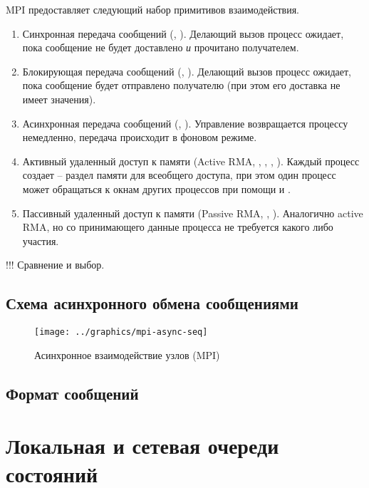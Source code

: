 MPI предоставляет следующий набор примитивов взаимодействия.

\begin{enumerate}
\item Синхронная передача сообщений (, ). Делающий вызов процесс
  ожидает, пока сообщение не будет доставлено \emph{и} прочитано получателем.
\item Блокирующая передача сообщений (, ). Делающий вызов процесс
  ожидает, пока сообщение будет отправлено получателю (при этом его доставка не
  имеет значения).
\item Асинхронная передача сообщений (, ). Управление возвращается
  процессу немедленно, передача происходит в фоновом режиме.
\item Активный удаленный доступ к памяти (Active RMA, ,
  , , ). Каждый процесс создает
   -- раздел памяти для всеобщего доступа, при этом один процесс может
  обращаться к окнам других процессов при помощи  и .
\item Пассивный удаленный доступ к памяти (Passive RMA, ,
  ). Аналогично active RMA, но со принимающего данные процесса не
  требуется какого либо участия.
\end{enumerate}

!!! Сравнение и выбор.

\subsection{Схема асинхронного обмена сообщениями}
\label{sec:async-mpi-queue}

\begin{figure}[ht]
  \centering
  \texttt{[image: ../graphics/mpi-async-seq]}  
  \caption{Асинхронное взаимодействие узлов (MPI)}
  \label{fig:mpi-async-seq}
\end{figure}

\subsection{Формат сообщений}
\label{sec:message-format}

\section{Локальная и сетевая очереди состояний}
\label{sec:local-network-queue}

